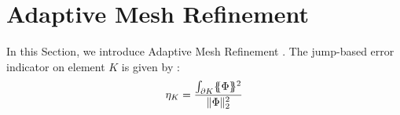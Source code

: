 \section{Adaptive Mesh Refinement} \label{sec_amr}
In this Section, we introduce Adaptive Mesh Refinement
\cite{Jessee1998,Wang2010a,Ragusa2010}. The jump-based error indicator on
element $K$ is given by \cite{Wang2010a}:
\begin{equation}
  \eta_K = \frac{\int_{\partial K} \{\!\!\{\Phi\}\!\!\}^2}{\|\Phi\|_2^2}
\end{equation}
